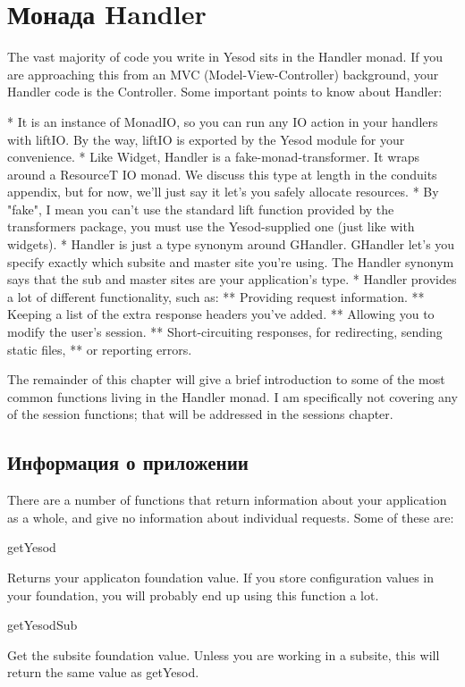 \section{Монада Handler}

The vast majority of code you write in Yesod sits in the Handler
monad. If you are approaching this from an MVC (Model-View-Controller)
background, your Handler code is the Controller. Some important points
to know about Handler:

* It is an instance of MonadIO, so you can run any IO action in your
handlers with liftIO. By the way, liftIO is exported by the Yesod
module for your convenience.
* Like Widget, Handler is a fake-monad-transformer. It wraps around a
ResourceT IO monad. We discuss this type at length in the conduits
appendix, but for now, we'll just say it let's you safely allocate
resources.
* By "fake", I mean you can't use the standard lift function provided
by the transformers package, you must use the Yesod-supplied one (just
like with widgets).
* Handler is just a type synonym around GHandler. GHandler let's you
specify exactly which subsite and master site you're using. The
Handler synonym says that the sub and master sites are your
application's type.
* Handler provides a lot of different functionality, such as:
** Providing request information.
** Keeping a list of the extra response headers you've added.
** Allowing you to modify the user's session.
** Short-circuiting responses, for redirecting, sending static files,
** or reporting errors.

The remainder of this chapter will give a brief introduction to some
of the most common functions living in the Handler monad. I am
specifically not covering any of the session functions; that will be
addressed in the sessions chapter.

\subsection{Информация о приложении}

There are a number of functions that return information about your
application as a whole, and give no information about individual
requests. Some of these are:

getYesod

Returns your applicaton foundation value. If you store configuration
values in your foundation, you will probably end up using this
function a lot.

getYesodSub

Get the subsite foundation value. Unless you are working in a subsite,
this will return the same value as getYesod.

